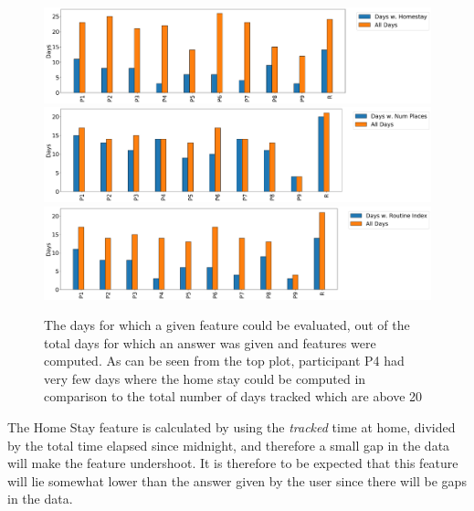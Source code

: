 \begin{figure}[h]
    \centering
    \includegraphics[width=\textwidth]{images/study/homestay_valid_days.png}
    \includegraphics[width=\textwidth]{images/study/numplaces_valid_days.png}
    \includegraphics[width=\textwidth]{images/study/routine_valid_days.png}
    \caption{The days for which a given feature could be evaluated, out of the total days for which an answer was given and features were computed. As can be seen from the top plot, participant P4 had very few days where the home stay could be computed in comparison to the total number of days tracked which are above 20}
    \label{fig:plot-daily}
\end{figure}

The Home Stay feature is calculated by using the \textit{tracked} time at home, divided by the total time elapsed since midnight, and therefore a small gap in the data will make the feature undershoot. It is therefore to be expected that this feature will lie somewhat lower than the answer given by the user since there will be gaps in the data. 

